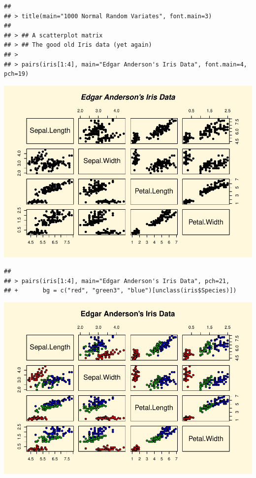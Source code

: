 \documentclass[
]{book}
\begin{document}
\begin{verbatim}
## 
## > title(main="1000 Normal Random Variates", font.main=3)
## 
## > ## A scatterplot matrix
## > ## The good old Iris data (yet again)
## > 
## > pairs(iris[1:4], main="Edgar Anderson's Iris Data", font.main=4, pch=19)
\end{verbatim}

\includegraphics{bookdown-demo_files/figure-latex/unnamed-chunk-5-8.pdf}

\begin{verbatim}
## 
## > pairs(iris[1:4], main="Edgar Anderson's Iris Data", pch=21,
## +       bg = c("red", "green3", "blue")[unclass(iris$Species)])
\end{verbatim}

\includegraphics{bookdown-demo_files/figure-latex/unnamed-chunk-5-9.pdf}
\end{document}

